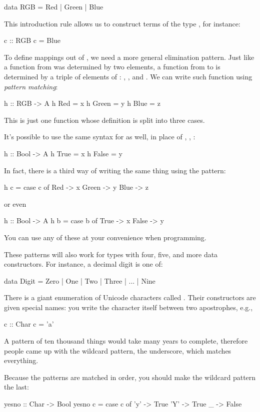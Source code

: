 \documentclass[DaoFP]{subfiles}
\begin{document}
\begin{haskell}
data RGB = Red | Green | Blue
\end{haskell}
This introduction rule allows us to construct terms of the type , for instance:
\begin{haskell}
c :: RGB
c = Blue
\end{haskell}
To define mappings out of , we need a more general elimination pattern. Just like a function from  was determined by two elements, a function from  to  is determined by a triple of elements of : , , and . We can write such function using \emph{pattern matching}:
\begin{haskell}
h :: RGB -> A
h Red   = x
h Green = y
h Blue  = z
\end{haskell}
This is just one function whose definition is split into three cases. 

It's possible to use the same syntax for  as well, in place of , , :
\begin{haskell}
h :: Bool -> A
h True  = x
h False = y
\end{haskell}
In fact, there is a third way of writing the same thing using the  pattern:
\begin{haskell}
h c = case c of
  Red   -> x
  Green -> y
  Blue  -> z
\end{haskell}
or even
\begin{haskell}
h :: Bool -> A
h b = case b of
  True  -> x
  False -> y
\end{haskell}
You can use any of these at your convenience when programming.

These patterns will also work for types with four, five, and more data constructors. For instance, a decimal digit is one of:
\begin{haskell}
data Digit = Zero | One | Two | Three | ... | Nine
\end{haskell}

There is a giant enumeration of Unicode characters called . Their constructors are given special names: you write the character itself between two apostrophes, e.g.,
\begin{haskell}
c :: Char
c = 'a'
\end{haskell}
A pattern of ten thousand things would take many years to complete, therefore people came up with the wildcard pattern, the underscore, which matches everything. 

Because the patterns are matched in order, you should make the wildcard pattern the last:
\begin{haskell}
yesno :: Char -> Bool
yesno c = case c of
  'y' -> True
  'Y' -> True
  _   -> False
\end{haskell}
\end{document}

